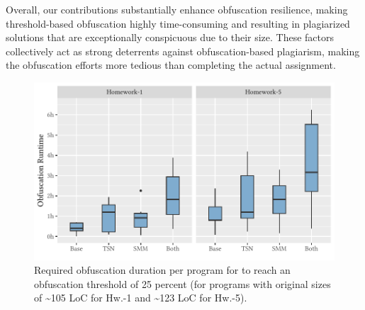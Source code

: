 Overall, our contributions substantially enhance obfuscation resilience, making threshold-based obfuscation highly time-consuming and resulting in plagiarized solutions that are exceptionally conspicuous due to their size. These factors collectively act as strong deterrents against obfuscation-based plagiarism, making the obfuscation efforts more tedious than completing the actual assignment.



\begin{figure}[p]
\centering
\includegraphics[width=\linewidth]{figures/disseval/eval-MOSSad-runtime_h.pdf}
\caption[Evaluation Results: Obfuscation Duration]{Required obfuscation duration per program for \mossad to reach an obfuscation threshold of 25 percent (for programs with original sizes of \textasciitilde105 LoC for Hw.-1 and \textasciitilde123 LoC for Hw.-5).}
\label{fig:stage5-result-time}
\end{figure}

